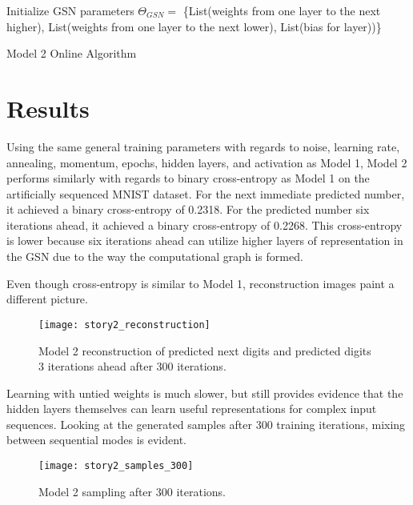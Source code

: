 \begin{algorithm}[h!]
	Initialize GSN parameters \(\Theta_{GSN} = \) \{List(weights from one layer to the next higher), List(weights from one layer to the next lower), List(bias for layer))\}\;
	\caption{ Model 2 Online Algorithm }
\end{algorithm}

\section{Results}

Using the same general training parameters with regards to noise, learning rate, annealing, momentum, epochs, hidden layers, and activation as Model 1, Model 2 performs similarly with regards to binary cross-entropy as Model 1 on the artificially sequenced MNIST dataset. For the next immediate predicted number, it achieved a binary cross-entropy of 0.2318.  For the predicted number six iterations ahead, it achieved a binary cross-entropy of 0.2268. This cross-entropy is lower because six iterations ahead can utilize higher layers of representation in the GSN due to the way the computational graph is formed.

Even though cross-entropy is similar to Model 1, reconstruction images paint a different picture.

\begin{figure}[h!]
  \centering
    \texttt{[image: story2\_reconstruction]}
\caption{Model 2 reconstruction of predicted next digits and predicted digits 3 iterations ahead after 300 iterations.}
\end{figure}

Learning with untied weights is much slower, but still provides evidence that the hidden layers themselves can learn useful representations for complex input sequences. Looking at the generated samples after 300 training iterations, mixing between sequential modes is evident.
\begin{figure}[h!]
  \centering
    \texttt{[image: story2\_samples\_300]}
\caption{Model 2 sampling after 300 iterations.}
\end{figure}


